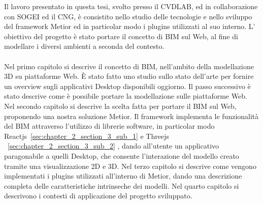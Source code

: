 Il lavoro presentato in questa tesi, svolto presso il CVDLAB, ed in collaborazione con SOGEI ed il CNG,
\`e consistito nello studio delle tecnologie e nello sviluppo del framework Metior ed in particolar modo i plugins
utilizzati al suo interno. L' obiettivo del progetto \`e stato portare il concetto di BIM sul Web, al fine di modellare
i diversi ambienti a seconda del contesto.\\
\\
Nel primo capitolo si descrive il concetto di BIM,
nell'ambito della modellazione 3D su piattaforme Web. \`E stato fatto uno studio sullo stato dell'arte
per fornire un overview sugli applicativi Desktop disponibili oggiorno.
Il passo successivo \`e stato descrive come \`e possibile portare la modellazione sulle piattaforme Web.
Nel secondo capitolo si descrive la scelta fatta per portare il BIM sul Web, proponendo una nostra soluzione Metior.
Il framework implementa le funzionalit\`a del BIM attraverso l'utilizzo di librerie software,
in particolar modo Reactjs~\ref{sec:chapter_2_section_3_sub_1} e Threejs ~\ref{sec:chapter_2_section_3_sub_2} ,
dando all'utente un applicativo paragonabile a quelli
Desktop, che consente l'interazione del modello creato tramite una visualizzazione 2D e 3D.
Nel terzo capitolo si descrive come vengono implementati i plugins utilizzati all'interno di Metior,
dando una descrizione completa delle caratteristiche intrinseche dei modelli.
Nel quarto capitolo si descrivono i contesti di applicazione del progetto sviluppato.
